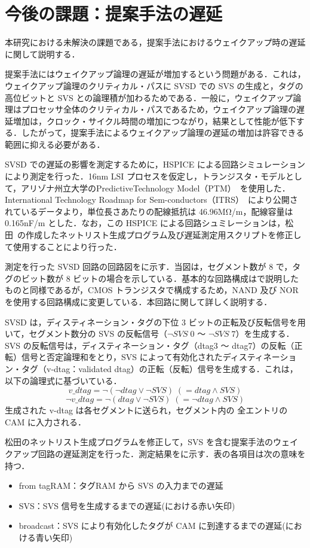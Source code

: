 
\chapter{今後の課題：提案手法の遅延}
\label{sec:appendix2}
本研究における未解決の課題である，提案手法におけるウェイクアップ時の遅延に関して説明する．

提案手法にはウェイクアップ論理の遅延が増加するという問題がある．これは，ウェイクアップ論理のクリティカル・パスに SVSD での SVS の生成と，タグの高位ビットと SVS との論理積が加わるためである．一般に，ウェイクアップ論理はプロセッサ全体のクリティカル・パスであるため，ウェイクアップ論理の遅延増加は，クロック・サイクル時間の増加につながり，結果として性能が低下する．したがって，提案手法によるウェイクアップ論理の遅延の増加は許容できる範囲に抑える必要がある．

SVSD での遅延の影響を測定するために，HSPICE による回路シミュレーションにより測定を行った．16nm LSI プロセスを仮定し，トランジスタ・モデルとして，アリゾナ州立大学のPredictiveTechnology Model（PTM）~\cite{model2012}を使用した．International Technology Roadmap for Sem-conductors（ITRS）~\cite{itrs2012}により公開されているデータより，単位長さあたりの配線抵抗は 46.96MΩ/m，配線容量は 0.165nF/m とした．なお，この HSPICE による回路シュミレーションは，松田~\cite{matsuda-thesis}の作成したネットリスト生成プログラム及び遅延測定用スクリプトを修正して使用することにより行った． 

測定を行った SVSD 回路の回路図をに示す．当図は，セグメント数が 8 で，タグのビット数が 8 ビットの場合を示している．基本的な回路構成はで説明したものと同様であるが，CMOS トランジスタで構成するため，NAND 及び NOR を使用する回路構成に変更している．本回路に関して詳しく説明する．

SVSD は，ディスティネーション・タグの下位 3 ビットの正転及び反転信号を用いて，セグメント数分の SVS の反転信号（$\lnot SVS\;0$ 〜 $\lnot SVS\;7$）を生成する． SVS の反転信号は，ディスティネーション・タグ（dtag3 〜 dtag7）の反転（正転）信号と否定論理和をとり，SVS によって有効化されたディスティネーション・タグ（v-dtag：validated dtag）の正転（反転）信号を生成する．これは，以下の論理式に基づいている．
\[
  v\_dtag = \lnot (\lnot dtag \lor \lnot SVS) \; (= dtag \land SVS) 
\]
\[
  \lnot v\_dtag = \lnot (dtag \lor \lnot SVS) \; (= \lnot dtag \land SVS) 
\]
生成された v-dtag は各セグメントに送られ，セグメント内の 全エントリの CAM に入力される．

松田のネットリスト生成プログラムを修正して，SVS を含む提案手法のウェイクアップ回路の遅延測定を行った．測定結果をに示す．表の各項目は次の意味を持つ．
  \begin{itemize}
    \item from tagRAM：タグRAM から SVS  の入力までの遅延
    \item SVS：SVS 信号を生成するまでの遅延(における赤い矢印)
    \item broadcast：SVS により有効化したタグが CAM に到達するまでの遅延(における青い矢印) 
  \end{itemize}


